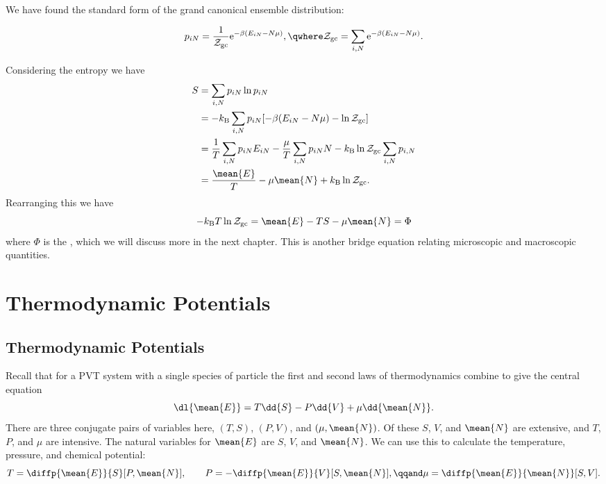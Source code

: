 \documentclass[fleqn]{NotesClass}
\newcommand*{\boltzmann}{k_{\mathrm{B}}}
\newcommand*{\gcpartition}{\mathcal{Z}_{\mathrm{gc}}}
\newcommand*{\e}{\mathrm{e}}
\begin{document}
    We have found the standard form of the grand canonical ensemble distribution:
    \begin{important}
        \vspace{-2.5ex}
        \begin{equation}
            p_{iN} = \frac{1}{\gcpartition} \e^{-\beta(E_{iN} - N\mu)}, \qwhere \gcpartition = \sum_{i,N} \e^{-\beta(E_{iN} - N\mu)}.
        \end{equation}
    \end{important}
    
    Considering the entropy we have
    \begin{align}
        S &= \sum_{i,N} p_{iN} \ln p_{iN}\\
        &= -\boltzmann\sum_{i,N} p_{iN}[-\beta(E_{iN} - N\mu) - \ln\gcpartition]\\
        &= \frac{1}{T}\sum_{i,N} p_{iN}E_{iN} - \frac{\mu}{T}\sum_{i,N} p_{iN} N - \boltzmann\ln\gcpartition \sum_{i,N}p_{i,N}\\
        &= \frac{\mean{E}}{T} - \mu\mean{N} + \boltzmann\ln\gcpartition.
    \end{align}
    Rearranging this we have
    \begin{equation}
        -\boltzmann T \ln \gcpartition = \mean{E} - TS - \mu \mean{N} = \Phi
    \end{equation}
    where \(\Phi\) is the , which we will discuss more in the next chapter.
    This is another bridge equation relating microscopic and macroscopic quantities.
    
    \chapter{Thermodynamic Potentials}
    \section{Thermodynamic Potentials}
    Recall that for a PVT system with a single species of particle the first and second laws of thermodynamics combine to give the central equation
    \begin{equation}
        \dl{\mean{E}} = T\dd{S} - P\dd{V} + \mu\dd{\mean{N}}.
    \end{equation}
    There are three conjugate pairs of variables here, \((T, S)\), \((P, V)\), and \((\mu, \mean{N})\).
    Of these \(S\), \(V\), and \(\mean{N}\) are extensive, and \(T\), \(P\), and \(\mu\) are intensive.
    The natural variables for \(\mean{E}\) are \(S\), \(V\), and \(\mean{N}\).
    We can use this to calculate the temperature, pressure, and chemical potential:
    \begin{equation}\label{eqn:T P chem potential from mean E derivatives}
        T = \diffp{\mean{E}}{S}[P, \mean{N}], \qquad P = -\diffp{\mean{E}}{V}[S, \mean{N}], \qqand \mu = \diffp{\mean{E}}{\mean{N}}[S, V].
    \end{equation}
    
\end{document}

